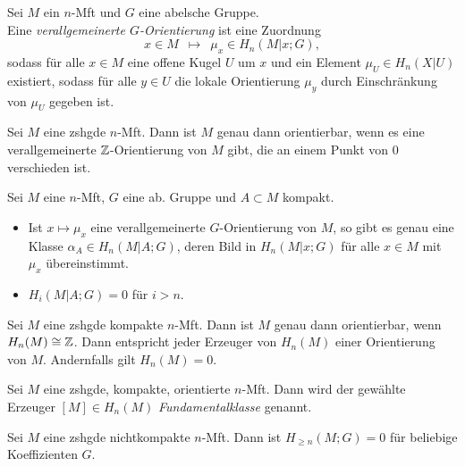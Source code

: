 \documentclass{cheat-sheet}
\begin{document}
\begin{defn}
  Sei $M$ ein $n$-Mft und $G$ eine abelsche Gruppe. \\
  Eine \emph{verallgemeinerte $G$-Orientierung} ist eine Zuordnung
  \[ x \in M \enspace\mapsto\enspace \mu_x \in H_n(M|x; G), \]
  sodass für alle $x \in M$ eine offene Kugel $U$ um $x$ und ein Element $\mu_U \in H_n(X|U)$ existiert, sodass für alle $y \in U$ die lokale Orientierung $\mu_y$ durch Einschränkung von $\mu_U$ gegeben ist.
\end{defn}

\begin{prop}
  Sei $M$ eine zshgde $n$-Mft. Dann ist $M$ genau dann orientierbar, wenn es eine verallgemeinerte $\mathbb{Z}$-Orientierung von $M$ gibt, die an einem Punkt von $0$ verschieden ist.
\end{prop}

\begin{lem}
  Sei $M$ eine $n$-Mft, $G$ eine ab. Gruppe und $A {\subset} M$ kompakt.
  \begin{itemize}
    \item Ist $x \mapsto \mu_x$ eine verallgemeinerte $G$-Orientierung von $M$, so gibt es genau eine Klasse $\alpha_A \in H_n(M|A; G)$, deren Bild in $H_n(M|x; G)$ für alle $x \in M$ mit $\mu_x$ übereinstimmt.
    \item $H_i(M|A; G) = 0$ für $i > n$.
  \end{itemize}
\end{lem}


\begin{kor}
  Sei $M$ eine zshgde kompakte $n$-Mft. Dann ist $M$ genau dann orientierbar, wenn $H_n(M) \cong \mathbb{Z}$. Dann entspricht jeder Erzeuger von $H_n(M)$ einer Orientierung von $M$. Andernfalls gilt $H_n(M) = 0$.
\end{kor}

\begin{defn}
  Sei $M$ eine zshgde, kompakte, orientierte $n$-Mft. Dann wird der gewählte Erzeuger $[M] \in H_n(M)$ \emph{Fundamentalklasse} genannt.
\end{defn}

\begin{prop}
  Sei $M$ eine zshgde nichtkompakte $n$-Mft. Dann ist $H_{\geq n}(M; G) = 0$ für beliebige Koeffizienten $G$.
\end{prop}

\end{document}
